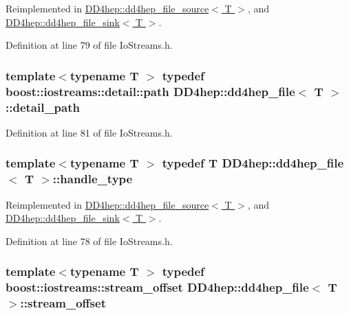 Reimplemented in \hyperlink{class_d_d4hep_1_1dd4hep__file__source_ad18eef60f1b38b5958eec9f287dac85a}{DD4hep::dd4hep\_\-file\_\-source$<$ T $>$}, and \hyperlink{class_d_d4hep_1_1dd4hep__file__sink_a358c907508083da65c4cd31725331460}{DD4hep::dd4hep\_\-file\_\-sink$<$ T $>$}.

Definition at line 79 of file IoStreams.h.\hypertarget{class_d_d4hep_1_1dd4hep__file_a1dc19fee9af970892ad53dd7eadc5426}{
\subsubsection[{detail\_\-path}]{\setlength{\rightskip}{0pt plus 5cm}template$<$typename T $>$ typedef boost::iostreams::detail::path {\bf DD4hep::dd4hep\_\-file}$<$ {\bf T} $>$::{\bf detail\_\-path}}}
\label{class_d_d4hep_1_1dd4hep__file_a1dc19fee9af970892ad53dd7eadc5426}


Definition at line 81 of file IoStreams.h.\hypertarget{class_d_d4hep_1_1dd4hep__file_a4d79f8d433cd7831ff818691424cd6fc}{
\subsubsection[{handle\_\-type}]{\setlength{\rightskip}{0pt plus 5cm}template$<$typename T $>$ typedef {\bf T} {\bf DD4hep::dd4hep\_\-file}$<$ {\bf T} $>$::{\bf handle\_\-type}}}
\label{class_d_d4hep_1_1dd4hep__file_a4d79f8d433cd7831ff818691424cd6fc}


Reimplemented in \hyperlink{class_d_d4hep_1_1dd4hep__file__source_abdabe1da6c2a2b2297dc86f41368c234}{DD4hep::dd4hep\_\-file\_\-source$<$ T $>$}, and \hyperlink{class_d_d4hep_1_1dd4hep__file__sink_a660f6328d32832c96f2b59afb2164214}{DD4hep::dd4hep\_\-file\_\-sink$<$ T $>$}.

Definition at line 78 of file IoStreams.h.\hypertarget{class_d_d4hep_1_1dd4hep__file_a28e1531542193871075e8b7f47818113}{
\subsubsection[{stream\_\-offset}]{\setlength{\rightskip}{0pt plus 5cm}template$<$typename T $>$ typedef boost::iostreams::stream\_\-offset {\bf DD4hep::dd4hep\_\-file}$<$ {\bf T} $>$::{\bf stream\_\-offset}}}
\label{class_d_d4hep_1_1dd4hep__file_a28e1531542193871075e8b7f47818113}


